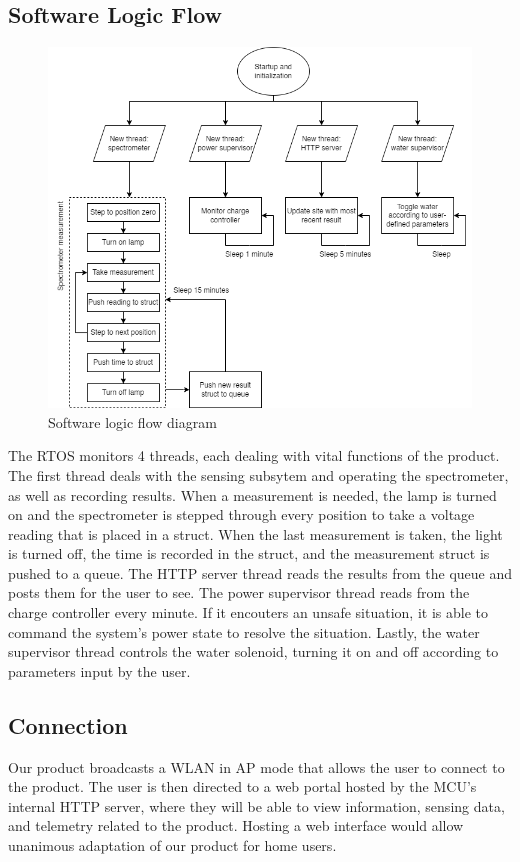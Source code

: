\documentclass[journal]{IEEEtran}
\begin{document}
\subsection{Software Logic Flow} 
\begin{figure}[H]
    \centering
    \label{fig:logic-flow}
    \includegraphics[width=\linewidth]{images/logic-flow.png}
    \caption{Software logic flow diagram}
\end{figure}

The RTOS monitors 4 threads, each dealing with vital functions of the product. The first thread deals with the sensing subsytem and operating the spectrometer, as well as recording results. When a measurement is needed, the lamp is turned on and the spectrometer is stepped through every position to take a voltage reading that is placed in a struct. When the last measurement is taken, the light is turned off, the time is recorded in the struct, and the measurement struct is pushed to a queue. The HTTP server thread reads the results from the queue and posts them for the user to see. The power supervisor thread reads from the charge controller every minute. If it encouters an unsafe situation, it is able to command the system's power state to resolve the situation. Lastly, the water supervisor thread controls the water solenoid, turning it on and off according to parameters input by the user.

\subsection{Connection}
Our product broadcasts a WLAN in AP mode that allows the user to connect to the product. The user is then directed to a web portal hosted by the MCU's internal HTTP server, where they will be able to view information, sensing data, and telemetry related to the product. Hosting a web interface would allow unanimous adaptation of our product for home users.
\end{document}
